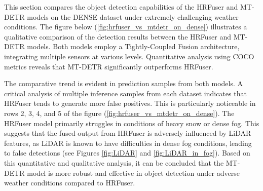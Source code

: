 \documentclass[report.tex]{subfiles}
\begin{document}
    This section compares the object detection capabilities of the HRFuser and MT-DETR models on the DENSE dataset under extremely challenging weather conditions. The figure below (\ref{fig:hrfuser_vs_mtdetr_on_dense}) illustrates a qualitative comparison of the detection results between the HRFuser and MT-DETR models. Both models employ a Tightly-Coupled Fusion architecture, integrating multiple sensors at various levels. Quantitative analysis using COCO metrics reveals that MT-DETR significantly outperforms HRFuser.

    The comparative trend is evident in prediction samples from both models. A critical analysis of multiple inference samples from each dataset indicates that HRFuser tends to generate more false positives. This is particularly noticeable in rows 2, 3, 4, and 5 of the figure (\ref{fig:hrfuser_vs_mtdetr_on_dense}). The HRFuser model primarily struggles in conditions of heavy snow or dense fog. This suggests that the fused output from HRFuser is adversely influenced by LiDAR features, as LiDAR is known to have difficulties in dense fog conditions, leading to false detections (see Figures \ref{fig:LiDAR} and \ref{fig:LiDAR_in_fog}). Based on this quantitative and qualitative analysis, it can be concluded that the MT-DETR model is more robust and effective in object detection under adverse weather conditions compared to HRFuser.
    
\end{document}
